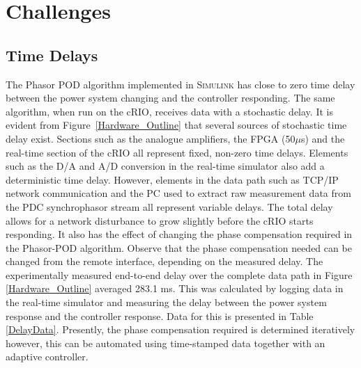 \documentclass[journal]{IEEEtran}
\begin{document}
\section{Challenges}\label{Challenges}

\subsection{Time Delays}

The Phasor POD algorithm implemented in \textsc{Simulink} has close to zero time delay between the power system changing and the controller responding. The same algorithm, when run on the cRIO, receives data with a stochastic delay. It is evident from Figure~\ref{Hardware_Outline} that several sources of stochastic time delay exist. Sections such as the analogue amplifiers, the FPGA (50$\mu$s) and the real-time section of the cRIO all represent fixed, non-zero time delays. Elements such as the D/A and A/D conversion in the real-time simulator also add a deterministic time delay. However, elements in the data path such as TCP/IP network communication and the PC used to extract raw measurement data from the PDC synchrophasor stream all represent variable delays. The total delay allows for a network disturbance to grow slightly before the cRIO starts responding. It also has the effect of changing the phase compensation required in the Phasor-POD algorithm. Observe that the phase compensation needed can be changed from the remote interface, depending on the measured delay. The experimentally measured end-to-end delay over the complete data path in Figure \ref{Hardware_Outline} averaged 283.1 ms. This was calculated by logging data in the real-time simulator and measuring the delay between the power system response and the controller response. Data for this is presented in Table \ref{DelayData}. Presently, the phase compensation required is determined iteratively however, this can be automated using time-stamped data together with an adaptive controller.
\end{document}

